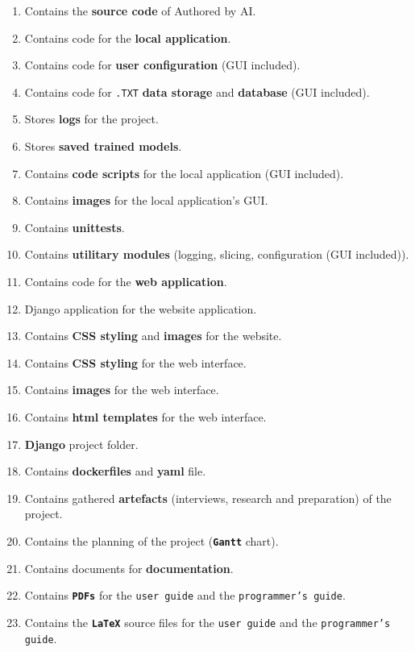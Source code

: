 \clearpage
\begin{enumerate}[label=(\arabic*).]
    \item Contains the \textbf{source code} of Authored by AI.
    \item Contains code for the \textbf{local application}.
    \item Contains code for \textbf{user configuration} (GUI included).
    \item Contains code for \texttt{.TXT} \textbf{data storage} and \textbf{database} (GUI included).
    \item Stores \textbf{logs} for the project.
    \item Stores \textbf{saved trained models}.
    \item Contains \textbf{code scripts} for the local application (GUI included).
    \item Contains \textbf{images} for the local application's GUI.
    \item Contains \textbf{unittests}.
    \item Contains \textbf{utilitary modules} (logging, slicing, configuration (GUI included)).
    \item Contains code for the \textbf{web application}.
    \item Django application for the website application.
    \item Contains \textbf{CSS styling} and \textbf{images} for the website.
    \item Contains \textbf{CSS styling} for the web interface.
    \item Contains \textbf{images} for the web interface.
    \item Contains \textbf{html templates} for the web interface.
    \item \textbf{Django} project folder.
    \item Contains \textbf{dockerfiles} and \textbf{yaml} file.
    \item Contains gathered \textbf{artefacts} (interviews, research and preparation) of the project.
    \item Contains the planning of the project (\textbf{\texttt{Gantt}} chart).
    \item Contains documents for \textbf{documentation}.
    \item Contains \textbf{\texttt{PDFs}} for the \texttt{user guide} and the \texttt{programmer's guide}.
    \item Contains the \textbf{\texttt{LaTeX}} source files for the \texttt{user guide} and the \texttt{programmer's guide}.
\end{enumerate}
\clearpage
